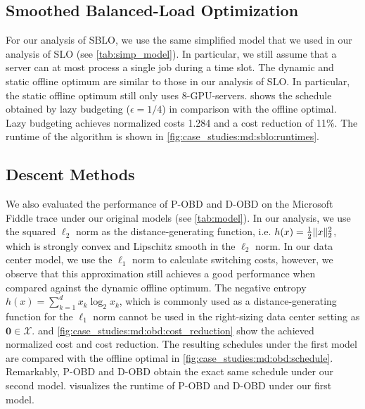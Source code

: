 \subsection{Smoothed Balanced-Load Optimization}

For our analysis of SBLO, we use the same simplified model that we used in our analysis of SLO (see \cref{tab:simp_model}). In particular, we still assume that a server can at most process a single job during a time slot. The dynamic and static offline optimum are similar to those in our analysis of SLO. In particular, the static offline optimum still only uses 8-GPU-servers.  shows the schedule obtained by lazy budgeting ($\epsilon = 1/4$) in comparison with the offline optimal. Lazy budgeting achieves normalized costs 1.284 and a cost reduction of 11\%. The runtime of the algorithm is shown in \cref{fig:case_studies:md:sblo:runtimes}.

\subsection{Descent Methods}

We also evaluated the performance of P-OBD and D-OBD on the Microsoft Fiddle trace under our original models (see \cref{tab:model}). In our analysis, we use the squared $\ell_2$ norm as the distance-generating function, i.e. $h(x) = \frac{1}{2} \lVert x\rVert_2^2$, which is strongly convex and Lipschitz smooth in the $\ell_2$ norm. In our data center model, we use the $\ell_1$ norm to calculate switching costs, however, we observe that this approximation still achieves a good performance when compared against the dynamic offline optimum. The negative entropy $h(x) = \sum_{k=1}^d x_k \log_2 x_k$, which is commonly used as a distance-generating function for the $\ell_1$ norm cannot be used in the right-sizing data center setting as $\mathbf{0} \in \mathcal{X}$.  and \cref{fig:case_studies:md:obd:cost_reduction} show the achieved normalized cost and cost reduction. The resulting schedules under the first model are compared with the offline optimal in \cref{fig:case_studies:md:obd:schedule}. Remarkably, P-OBD and D-OBD obtain the exact same schedule under our second model.  visualizes the runtime of P-OBD and D-OBD under our first model.

